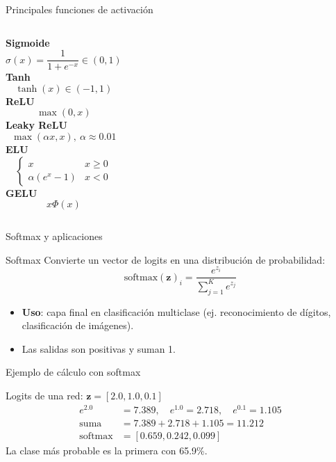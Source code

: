 \documentclass[aspectratio=169, 10pt, xcolor=table]{beamer}
\begin{document}
\begin{frame}{Principales funciones de activación}
    \begin{columns}[t]
        \textbf{Sigmoide}
        \[
        \sigma(x) = \frac{1}{1+e^{-x}} \in (0,1)
        \]
        \textbf{Tanh}
        \[
        \tanh(x) \in (-1,1)
        \]
        \textbf{ReLU}
        \[
        \max(0,x)
        \]
        \textbf{Leaky ReLU}
        \[
        \max(\alpha x,x), \ \alpha\approx0.01
        \]
        \textbf{ELU}
        \[
        \begin{cases}x & x\ge0\\ \alpha(e^x-1) & x<0\end{cases}
        \]
        \textbf{GELU}
        \[
        x\Phi(x)
        \]
    \end{columns}
\end{frame}

\begin{frame}{Softmax y aplicaciones}
    \begin{block}{Softmax}
        Convierte un vector de logits en una distribución de probabilidad:
        \[
        \text{softmax}(\mathbf{z})_i = \frac{e^{z_i}}{\sum_{j=1}^{K} e^{z_j}}
        \]
    \end{block}
    \begin{itemize}
        \item \textbf{Uso}: capa final en clasificación multiclase (ej. reconocimiento de dígitos, clasificación de imágenes).
        \item Las salidas son positivas y suman 1.
    \end{itemize}
\end{frame}

\begin{frame}{Ejemplo de cálculo con softmax}
    \begin{exampleblock}
        {Logits de una red: $\mathbf{z} = [2.0, 1.0, 0.1]$}
        \begin{align*}
            e^{2.0} &= 7.389, \quad e^{1.0}=2.718, \quad e^{0.1}=1.105 \\
            \text{suma} &= 7.389+2.718+1.105 = 11.212 \\
            \text{softmax} &= [0.659, 0.242, 0.099]
        \end{align*}
        La clase más probable es la primera con 65.9\%.
    \end{exampleblock}
\end{frame}
\end{document}
